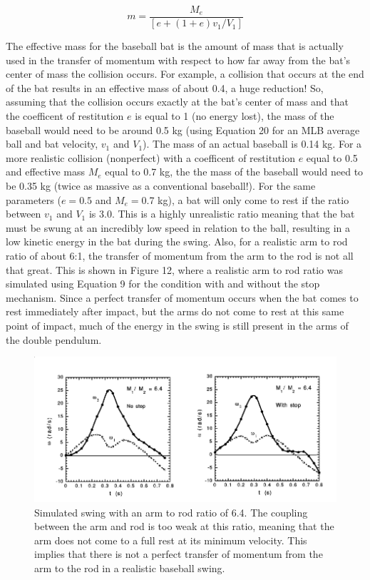\documentclass[%
 aip,
 amsmath,amssymb,
 reprint,%
 floatfix,%
]{revtex4-1}
\begin{document}
\begin{equation}
	m= \frac{M_e}{[e+(1+e)v_1/V_1]}
\end{equation}

The effective mass for the baseball bat is the amount of mass that is actually used in the transfer of momentum with respect to how far away from the bat's center of mass the collision occurs. For example, a collision that occurs at the end of the bat results in an effective mass of about 0.4, a huge reduction! So, assuming that the collision occurs exactly at the bat's center of mass and that the coefficent of restitution $e$ is equal to 1 (no energy lost), the mass of the baseball would need to be around 0.5 kg (using Equation 20 for an MLB average ball and bat velocity, $v_1$ and $V_1$). The mass of an actual baseball is 0.14 kg. For a more realistic collision (nonperfect) with a coefficent of restitution $e$ equal to 0.5 and effective mass $M_e$ equal to 0.7 kg, the the mass of the baseball would need to be 0.35 kg (twice as massive as a conventional baseball!). For the same parameters ($e=0.5$ and $M_e=$0.7 kg), a bat will only come to rest if the ratio between $v_1$ and $V_1$ is 3.0. This is a highly unrealistic ratio meaning that the bat must be swung at an incredibly low speed in relation to the ball, resulting in a low kinetic energy in the bat during the swing. Also, for a realistic arm to rod ratio of about 6:1, the transfer of momentum from the arm to the rod is not all that great. This is shown in Figure 12, where a realistic arm to rod ratio was simulated using Equation 9 for the condition with and without the stop mechanism. Since a perfect transfer of momentum occurs when the bat comes to rest immediately after impact, but the arms do not come to rest at this same point of impact, much of the energy in the swing is still present in the arms of the double pendulum.

\begin{figure}[H]
	\centering
	\includegraphics[scale=0.28]{swingratio.png}
	\caption{Simulated swing with an arm to rod ratio of 6.4. The coupling between the arm and rod is too weak at this ratio, meaning that the arm does not come to a full rest at its minimum velocity. This implies that there is not a perfect transfer of momentum from the arm to the rod in a realistic baseball swing.}
\end{figure}
\end{document}
